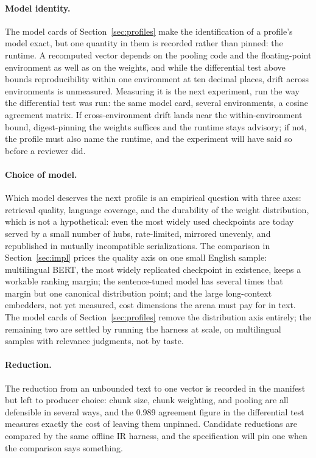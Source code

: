 \documentclass[sigconf]{acmart}
\begin{document}
\paragraph{Model identity.} The model cards of
Section~\ref{sec:profiles} make the identification of a profile's model
exact, but one quantity in them is recorded rather than pinned: the runtime.
A recomputed vector depends on the pooling code and the floating-point
environment as well as on the weights, and while the differential test above
bounds reproducibility within one environment at ten decimal places, drift
across environments is unmeasured. Measuring it is the next experiment, run
the way the differential test was run: the same model card, several
environments, a cosine agreement matrix. If cross-environment drift lands
near the within-environment bound, digest-pinning the weights suffices and
the runtime stays advisory; if not, the profile must also name the runtime,
and the experiment will have said so before a reviewer did.

\paragraph{Choice of model.} Which model deserves the next profile is an
empirical question with three axes: retrieval quality, language coverage, and
the durability of the weight distribution, which is not a hypothetical: even
the most widely used checkpoints are today served by a small number of hubs,
rate-limited, mirrored unevenly, and republished in mutually incompatible
serializations. The comparison in Section~\ref{sec:impl} prices the quality
axis on one small English sample: multilingual BERT, the most widely
replicated checkpoint in existence, keeps a workable ranking margin; the
sentence-tuned model has several times that margin but one canonical
distribution point; and the large long-context embedders, not yet measured,
cost dimensions the arena must pay for in text. The model cards of
Section~\ref{sec:profiles} remove the distribution axis entirely; the
remaining two are settled by running the harness at scale, on multilingual
samples with relevance judgments, not by taste.

\paragraph{Reduction.} The reduction from an unbounded text to one vector is
recorded in the manifest but left to producer choice: chunk size, chunk
weighting, and pooling are all defensible in several ways, and the 0.989
agreement figure in the differential test measures exactly the cost of
leaving them unpinned. Candidate reductions are compared by the same offline
IR harness, and the specification will pin one when the comparison says
something.
\end{document}
